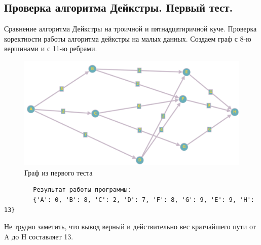 \documentclass[a4paper, 12pt]{article}
\theoremstyle{definition}
\begin{document}
	\subsection{Проверка алгоритма Дейкстры. Первый тест.} Сравнение алгоритма Дейкстры на троичной и пятнадцатиричной
	куче. Проверка коректности работы алгоритма дейкстры на малых данных.
	Создаем граф с 8-ю вершинами и с 11-ю ребрами.\\
	\begin{figure}[h]
		\centering
		\includegraphics[scale=0.2]{img/1graph.png}
		\caption{Граф из первого теста}
	\end{figure}
	\begin{verbatim}
		Результат работы программы:
		{'A': 0, 'B': 8, 'C': 2, 'D': 7, 'F': 8, 'G': 9, 'E': 9, 'H': 13}
	\end{verbatim}
	Не трудно заметить, что вывод верный и действительно вес кратчайшего
	пути от A до H составляет 13.\\ \\
	\newpage
\end{document}
